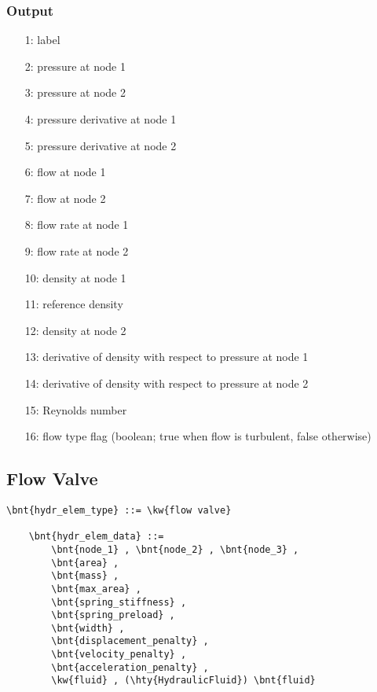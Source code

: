 \subsubsection{Output}
\begin{itemize}
\item[1:] label
\item[2:] pressure at node 1
\item[3:] pressure at node 2
\item[4:] pressure derivative at node 1
\item[5:] pressure derivative at node 2
\item[6:] flow at node 1
\item[7:] flow at node 2
\item[8:] flow rate at node 1
\item[9:] flow rate at node 2
\item[10:] density at node 1
\item[11:] reference density
\item[12:] density at node 2
\item[13:] derivative of density with respect to pressure at node 1
\item[14:] derivative of density with respect to pressure at node 2
\item[15:] Reynolds number
\item[16:] flow type flag (boolean; true when flow is turbulent, false otherwise)
\end{itemize}



\subsection{Flow Valve}
\label{sec:EL:HYDR:FLOW_VALVE}
\begin{Verbatim}[commandchars=\\\{\}]
    \bnt{hydr_elem_type} ::= \kw{flow valve}

    \bnt{hydr_elem_data} ::=
        \bnt{node_1} , \bnt{node_2} , \bnt{node_3} ,
        \bnt{area} ,
        \bnt{mass} ,
        \bnt{max_area} ,
        \bnt{spring_stiffness} ,
        \bnt{spring_preload} ,
        \bnt{width} ,
        \bnt{displacement_penalty} ,
        \bnt{velocity_penalty} ,
        \bnt{acceleration_penalty} ,
        \kw{fluid} , (\hty{HydraulicFluid}) \bnt{fluid}
\end{Verbatim}



